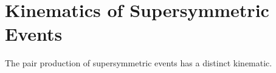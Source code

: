\chapter{Kinematics of Supersymmetric Events}
The pair production of supersymmetric events has a distinct kinematic.
